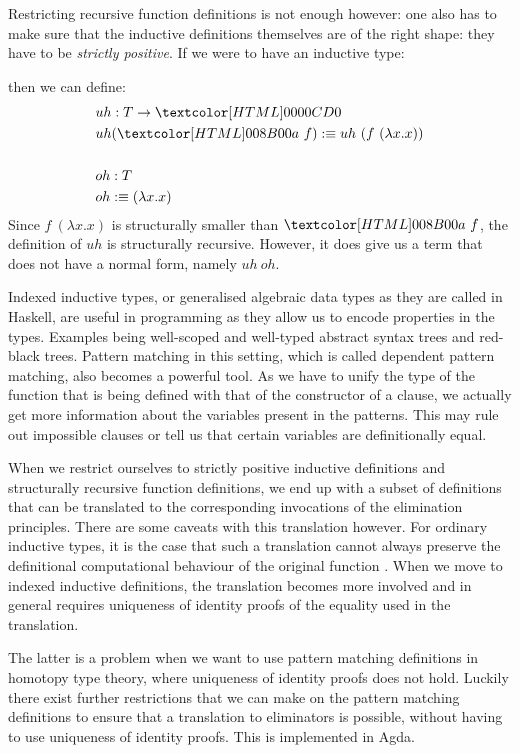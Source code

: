 Restricting recursive function definitions is not enough however: one
also has to make sure that the inductive definitions themselves are of
the right shape: they have to be \emph{strictly positive}. If we were
to have an inductive type:
\begin{datatype}{\Tty}{\Type}
  \constr{\Ta}{(\Tty \to \Tty) \to \Tty}
\end{datatype}
then we can define:
\begin{align*}
  &uh : T \to \emptyty \\
  &uh (\Ta\ f) \ddefeq uh\ (f\ (\lambda x . x)) \\
  \\
  &oh : T \\
  &oh \ddefeq (\lambda x . x)
\end{align*}
Since $f\ (\lambda x . x)$ is structurally smaller than $\Ta\ f$, the
definition of $uh$ is structurally recursive. However, it does give us
a term that does not have a normal form, namely $uh\ oh$.

Indexed inductive types, or generalised algebraic data types as they
are called in Haskell, are useful in programming as they allow us to
encode properties in the types. Examples being well-scoped and
well-typed abstract syntax trees and red-black trees. Pattern matching
in this setting, which is called dependent pattern matching, also
becomes a powerful tool. As we have to unify the type of the function
that is being defined with that of the constructor of a clause, we
actually get more information about the variables present in the
patterns. This may rule out impossible clauses or tell us that certain
variables are definitionally equal.

When we restrict ourselves to strictly positive inductive definitions
and structurally recursive function definitions, we end up with a
subset of definitions that can be translated to the corresponding
invocations of the elimination principles. There are some caveats with
this translation however. For ordinary inductive types, it is the case
that such a translation cannot always preserve the definitional
computational behaviour of the original function
\cite{McBride2006ii}. When we move to indexed inductive definitions,
the translation becomes more involved and in general requires
uniqueness of identity proofs of the equality used in the translation.

The latter is a problem when we want to use pattern matching
definitions in homotopy type theory, where uniqueness of identity
proofs does not hold. Luckily there exist further restrictions that we
can make on the pattern matching definitions to ensure that a
translation to eliminators is possible, without having to use
uniqueness of identity proofs. This is implemented in Agda.

